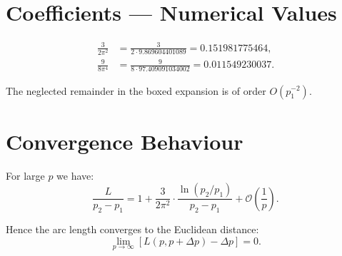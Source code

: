 \section{Coefficients --- Numerical Values}

\begin{align}
\frac{3}{2\pi^2}
&= \frac{3}{2 \cdot 9.869604401089}
= 0.151981775464, \\[6pt]
\frac{9}{8\pi^4}
&= \frac{9}{8 \cdot 97.409091034002}
= 0.011549230037.
\end{align}

The neglected remainder in the boxed expansion is of order $O(p_1^{-2})$.

\section{Convergence Behaviour}

For large $p$ we have:
\[
\frac{L}{p_2 - p_1}
= 1
+ \frac{3}{2\pi^2}
  \cdot \frac{\ln(p_2/p_1)}{p_2 - p_1}
+ \mathcal{O}\!\left(\frac{1}{p}\right).
\]

Hence the arc length converges to the Euclidean distance:
\[
\lim_{p\to\infty} \left[L(p,p+\Delta p) - \Delta p\right] = 0.
\]
